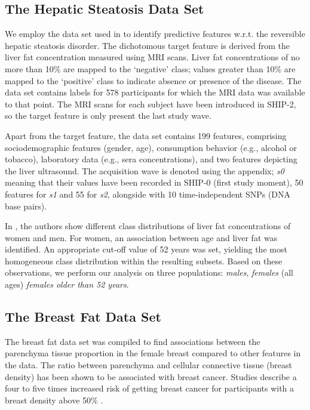 \documentclass[journal]{style/vgtc} 			          %
\begin{document}
\subsection{The Hepatic Steatosis Data Set}
We employ the data set used in \cite{Niemann2014} to identify predictive features w.r.t. the reversible hepatic steatosis disorder.
The dichotomous target feature is derived from the liver fat concentration measured using MRI scans.
Liver fat concentrations of no more than 10\% are mapped to the `negative' class; values greater than 10\% are mapped to the `positive' class to indicate absence or presence of the disease.
The data set contains labels for 578 participants for which the MRI data was available to that point.
The MRI scans for each subject have been introduced in SHIP-2, so the target feature is only present the last study wave.

Apart from the target feature, the data set contains 199 features, comprising sociodemographic features (gender, age), consumption behavior (e.g., alcohol or tobacco), laboratory data (e.g., sera concentrations), and two features depicting the liver ultrasound.
The acquisition wave is denoted using the appendix; \emph{s0} meaning that their values have been recorded in SHIP-0 (first study moment), 50 features for \emph{s1} and 55 for \emph{s2}, alongside with 10 time-independent SNPs (DNA base pairs).

In \cite{Niemann2014}, the authors show different class distributions of liver fat concentrations of women and men.
For women, an association between age and liver fat was identified.
An appropriate cut-off value of 52 years was set, yielding the most homogeneous class distribution within the resulting subsets.
Based on these observations, we perform our analysis on three populations: \emph{males}, \emph{females} (all ages) \emph{females older than 52 years}.
\subsection{The Breast Fat Data Set}
The breast fat data set was compiled to find associations between the parenchyma tissue proportion in the female breast compared to other features in the data.
The ratio between parenchyma and cellular connective tissue (breast density) has been shown to be associated with breast cancer.
Studies describe a four to five times increased risk of getting breast cancer for participants with a breast density above 50\% \cite{Mccormack2006}.
\end{document}

